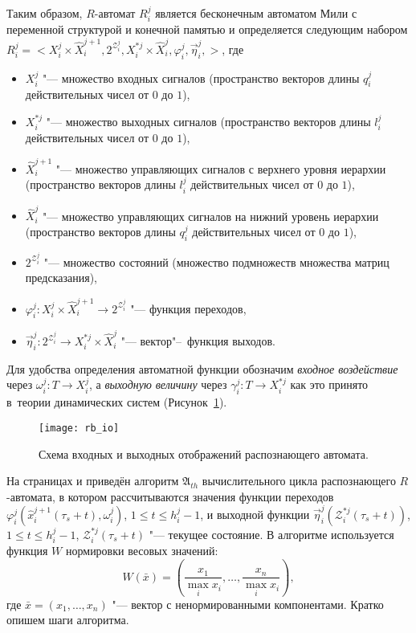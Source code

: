 Таким образом, $R$-автомат $R_i^j$ является бесконечным автоматом Мили с переменной структурой и конечной памятью и определяется следующим набором $R_i^j=<X_i^j\times \hat{X}_i^{j+1}, 2^{\mathcal Z_i^j}, X_i^{*j}\times \hat{X}_i^j,\varphi_i^j,\vec\eta_i^j,>$, где
\begin{itemize}
	\item $X_i^j$ "--- множество входных сигналов (пространство векторов длины $q_i^j$ действительных чисел от $0$ до $1$), 
	\item $X_i^{*j}$ "--- множество выходных сигналов (пространство векторов длины $l_i^j$ действительных чисел от $0$ до $1$), 
	\item $\hat{X}_i^{j+1}$ "--- множество управляющих сигналов с верхнего уровня иерархии (пространство векторов длины $l_i^j$ действительных чисел от $0$ до $1$),
	\item $\hat{X}_i^j$ "--- множество управляющих сигналов на нижний уровень иерархии (пространство векторов длины $q_i^j$ действительных чисел от $0$ до $1$),
	\item $2^{\mathcal Z_i^j}$ "--- множество состояний (множество подмножеств множества матриц предсказания),
	\item $\varphi_i^j:X_i^j\times \hat{X}_i^{j+1}\to 2^{\mathcal Z_i^j}$ "--- функция переходов,
	\item $\vec\eta_i^j:2^{\mathcal Z_i^j} \to X_i^{*j}\times \hat{X}_i^j$ "--- вектор"--~функция выходов.
\end{itemize}

Для удобства определения автоматной функции обозначим \textit{входное воздействие} через $\omega_i^j:T{\to}X_i^j$, а \textit{выходную величину} через $\gamma_i^j:T{\to}X_i^{*j}$ как это принято в~теории динамических систем \cite{Kalman1971, KalmanE1971} (Рисунок~\ref{fig:rb_io}).

\begin{figure}[h]
	\centering
	\texttt{[image: rb\_io]}
	\caption{Схема входных и выходных отображений распознающего автомата.}
	\label{fig:rb_io}
\end{figure}

На страницах \pageref{alg:th_init} и \pageref{alg:th_cycle} приведён алгоритм $\mathfrak{A}_{th}$ вычислительного цикла распознающего $R$-автомата, в котором рассчитываются значения функции переходов $\varphi_i^j(\hat{x}_i^{j+1}(\tau_s+t),\omega_i^j)$, $1\leqslant{t}\leqslant h_i^j-1$, и выходной функции $\vec\eta_i^j(\mathcal Z_i^{*j}(\tau_s+t))$, $1\leqslant{t}\leqslant h_i^j-1$, $\mathcal Z_i^{*j}(\tau_s+t)$ "--- текущее состояние. В алгоритме используется функция $W$ нормировки весовых значений:
\begin{equation}
	W(\bar x)=\left(\frac{x_1}{\max\limits_i x_i},\dots,\frac{x_n}{\max\limits_i x_i}\right),
\end{equation} 
где $\bar x=(x_1,\dots,x_n)$ "--- вектор с ненормированными компонентами. Кратко опишем шаги алгоритма.

